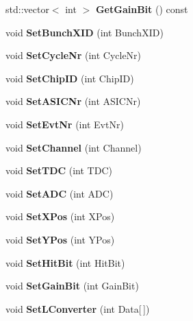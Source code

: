 \begin{DoxyCompactItemize}
\item 
std\-::vector$<$ int $>$ {\bfseries Get\-Gain\-Bit} () const \label{classLConverter_a5e61fac60253d34fa40a9c5442a13196}

\item 
void {\bfseries Set\-Bunch\-X\-I\-D} (int Bunch\-X\-I\-D)\label{classLConverter_a05a8cef4b9c87f720261fc52cce1e193}

\item 
void {\bfseries Set\-Cycle\-Nr} (int Cycle\-Nr)\label{classLConverter_a7efeeb526c6db39ff43a017bb74b29e0}

\item 
void {\bfseries Set\-Chip\-I\-D} (int Chip\-I\-D)\label{classLConverter_a37f140c2b9055799ee6a82cc4d73c44e}

\item 
void {\bfseries Set\-A\-S\-I\-C\-Nr} (int A\-S\-I\-C\-Nr)\label{classLConverter_acfc4cc61fc627016acaf883f4d0046d4}

\item 
void {\bfseries Set\-Evt\-Nr} (int Evt\-Nr)\label{classLConverter_ac5115b177d290824b2a787b9e068fc19}

\item 
void {\bfseries Set\-Channel} (int Channel)\label{classLConverter_a340a2d351e2fdadccaf9dd197f50237c}

\item 
void {\bfseries Set\-T\-D\-C} (int T\-D\-C)\label{classLConverter_a08fa1525b279272c5c5e54b63d1cb201}

\item 
void {\bfseries Set\-A\-D\-C} (int A\-D\-C)\label{classLConverter_ac5bd4c6306a2cee6a935e973058a905a}

\item 
void {\bfseries Set\-X\-Pos} (int X\-Pos)\label{classLConverter_a6971660f486140f26227ceaf7a8ce09a}

\item 
void {\bfseries Set\-Y\-Pos} (int Y\-Pos)\label{classLConverter_adc5fee91ab6526179b186ad11ab25c7e}

\item 
void {\bfseries Set\-Hit\-Bit} (int Hit\-Bit)\label{classLConverter_aaa94bc9bb1609136b6fd81523649c53c}

\item 
void {\bfseries Set\-Gain\-Bit} (int Gain\-Bit)\label{classLConverter_a8c8d34fb8da1b09a171ca7ab345aaaaf}

\item 
void {\bfseries Set\-L\-Converter} (int Data[$\,$])\label{classLConverter_a180d5e6b80a72eeab6ab0cb090d0c740}


\end{DoxyCompactItemize}
